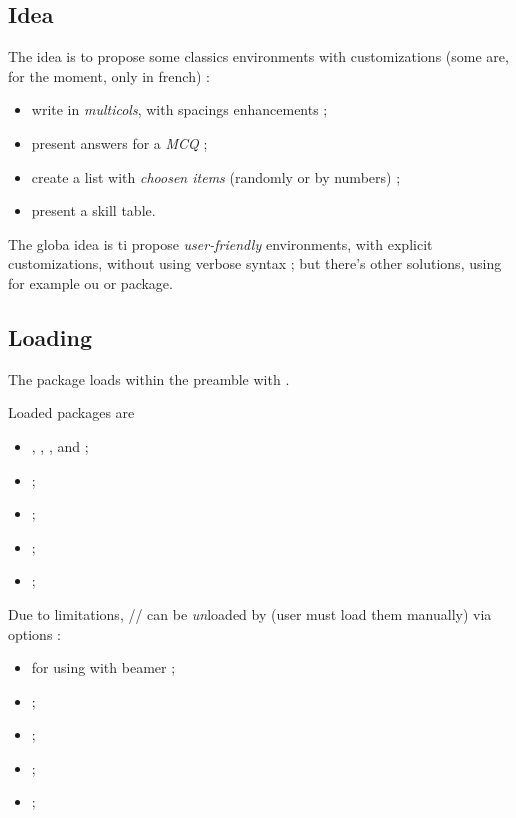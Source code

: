 \documentclass[english,11pt,a4paper]{article}
\begin{document}
\subsection{Idea}

The idea is to propose some classics environments with customizations (some are, for the moment, only in french) :

\begin{itemize}
	\item write in \textit{multicols}, with spacings enhancements ;
	\item present answers for a \textit{MCQ} ;
	\item create a list with \textit{choosen items} (randomly or by numbers) ;
	\item present a skill table.
\end{itemize}

\smallskip

The globa idea is ti propose \textit{user-friendly} environments, with explicit customizations, without using verbose syntax ; but there's other solutions, using for example  ou  or  package.

\subsection{Loading}

The package loads within the preamble with .

Loaded packages are 

\begin{itemize}
	\item {}, , ,  and  ;
	\item {} ;
	\item {} ;
	\item {} ;
	\item {} ;
\end{itemize}

Due to limitations, // can be \textit{un}loaded by  (user must load them manually) via options :

\begin{itemize}
	\item {} for using with \textsf{beamer} ;
	\item {} ;
	\item {} ;
	\item {} ;
	\item {} ;
\end{itemize}
\end{document}
